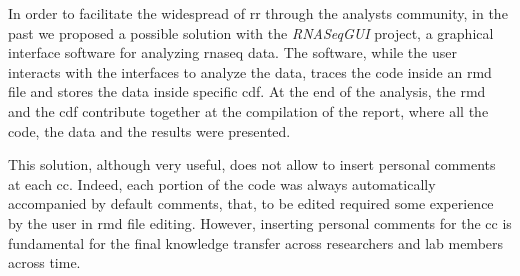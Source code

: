 In order to facilitate the widespread of \gls{rr} through the analysts community, in the past we proposed a possible solution with the \textit{RNASeqGUI} \cite{russo2015advantages} project, a graphical interface software for analyzing \gls{rnaseq} data.
The software, while the user interacts with the interfaces to analyze the data, traces the code inside an \gls{rmd} file and stores the data inside specific \gls{cdf}.
At the end of the analysis, the \gls{rmd} and the \gls{cdf} contribute together at the compilation of the report, where all the code, the data and the results were presented.

This solution, although very useful, does not allow to insert personal comments at each \gls{cc}.
Indeed, each portion of the code was always automatically accompanied by default comments, that, to be edited required some experience by the user in \gls{rmd} file editing.
However, inserting personal comments for the \gls{cc} is fundamental for the final knowledge transfer across researchers and lab members across time.


